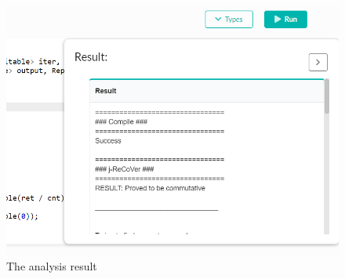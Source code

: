 \begin{figure}
\begin{center}
\includegraphics[width=.8\linewidth]{screenshots/analysis_result}
\caption{The analysis result}
\label{fig:analysis_result}
\end{center}
\end{figure}

